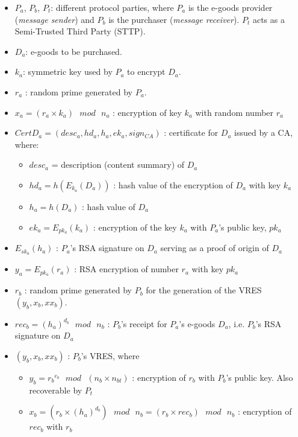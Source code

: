 \documentclass{article}
\begin{document}
\begin{itemize}
    \item $P_a$, $P_b$, $P_t$: different protocol parties, where
    $P_a$ is the e-goods provider (\emph{message sender}) and $P_b$ is the
    purchaser (\emph{message receiver}). $P_t$ acts as a Semi-Trusted
    Third Party (STTP).
    \item $D_a$: e-goods to be purchased.
    \item $k_a$: symmetric key used by $P_a$ to encrypt $D_a$.
    \item $r_a$ : random prime generated by $P_a$.
    \item $x_a = (r_a \times k_a)\mbox{ }mod\mbox{ }n_a$ : encryption of
    key $k_a$ with random number $r_a$
    \item $CertD_a = (desc_a, hd_a, h_a, ek_a, sign_{CA})$ : certificate for
    $D_a$ issued by a CA, where:
    \begin{itemize}
       \item $desc_a$ = description (content summary) of $D_a$
       \item $hd_a = h(E_{k_a}(D_a))$ : hash value of the encryption of
       $D_a$ with key $k_a$
       \item $h_a = h(D_a)$ : hash value of $D_a$
       \item $ek_a = E_{pk_a}(k_a)$ : encryption of the key $k_a$
       with $P_a$'s public key, $pk_a$
    \end{itemize}
    \item $E_{sk_a}(h_a)$ : $P_a$'s RSA signature on $D_a$ serving as a proof
    of origin of $D_a$
    \item $y_a = E_{pk_a}(r_a)$ : RSA encryption of number $r_a$ with key $pk_a$
    \item $r_b$ : random prime generated by $P_b$ for the generation of the
    VRES $(y_b, x_b, xx_b)$.
    \item $rec_b = (h_a)^{d_b} \mbox{ } mod \mbox{ } n_b$ : $P_b$'s receipt
    for $P_a$'s e-goods $D_a$, i.e. $P_b$'s RSA signature on $D_a$
    \item $(y_b, x_b, xx_b)$ : $P_b$'s VRES, where
    \begin{itemize}
       \item $y_b = {r_b}^{e_b} \mbox{ } mod \mbox{ } (n_b \times n_{bt})$ :
       encryption of $r_b$ with $P_b$'s public key. Also recoverable by $P_t$
       \item $x_b = (r_b \times (h_a)^{d_b}) \mbox{ } mod \mbox{ } n_b = (r_b
       \times rec_b) \mbox{ } mod \mbox{ } n_b$ : encryption of $rec_b$ with $r_b$

\end{itemize}
\end{itemize}
\end{document}
